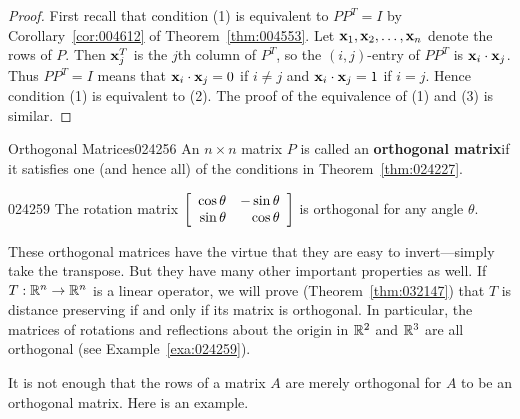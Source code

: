 \begin{proof}
First recall that condition (1) is equivalent to $PP^{T} = I$ by Corollary~\ref{cor:004612} of Theorem~\ref{thm:004553}. Let $\textbf{x}_{1}, \textbf{x}_{2}, \dots, \textbf{x}_{n}$ denote the rows of $P$. Then $\textbf{x}_{j}^{T}$ is the $j$th column of $P^{T}$, so the $(i, j)$-entry of $PP^{T}$ is $\textbf{x}_{i} \cdot \textbf{x}_{j}$. Thus $PP^{T} = I$ means that $\textbf{x}_{i} \cdot \textbf{x}_{j} = 0$ if $i \neq j$ and $\textbf{x}_{i} \cdot \textbf{x}_{j} = 1$ if $i = j$. Hence condition (1) is equivalent to (2). The proof of the equivalence of (1) and (3) is similar.
\end{proof}

\begin{definition}{Orthogonal Matrices}{024256}
An $n \times n$ matrix $P$ is called an \textbf{orthogonal matrix}\footnotemark if it satisfies one (and hence all) of the conditions in Theorem~\ref{thm:024227}.
\end{definition}

\begin{example}{}{024259}
The rotation matrix 
$\left[ \begin{array}{rr}
\cos\theta & -\sin\theta \\
\sin\theta & \cos\theta
\end{array}\right]$ is orthogonal for any angle $\theta$.
\end{example}

These orthogonal matrices have the 
virtue that they are easy to invert---simply take the transpose. But they 
have many other important properties as well. If $T : \mathbb{R}^n \to \mathbb{R}^n$ is a linear operator, we will prove (Theorem~\ref{thm:032147}) that $T$ is distance preserving if and only if its matrix is orthogonal. In particular, the matrices of rotations and reflections about the origin in $\mathbb{R}^2$ and $\mathbb{R}^3$ are all orthogonal (see Example~\ref{exa:024259}).


It is not enough that the rows of a matrix $A$ are merely orthogonal for $A$ to be an orthogonal matrix. Here is an example.


